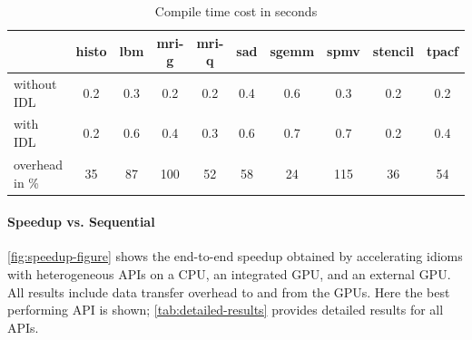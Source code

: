 \begin{table}[t]
  \begin{tabular}{lccccccccc}
  \toprule
  & \hspace{0.530mm}histo\hspace{0.53mm}
  & \hspace{0.530mm}lbm\hspace{0.530mm}
  & \hspace{0.530mm}mri-g\hspace{0.530mm}
  & \hspace{0.530mm}mri-q\hspace{0.530mm}
  & \hspace{0.530mm}sad\hspace{0.530mm}
  & \hspace{0.530mm}sgemm\hspace{0.530mm}
  & \hspace{0.530mm}spmv\hspace{0.530mm}
  & \hspace{0.530mm}stencil\hspace{0.530mm}
  & \hspace{0.530mm}tpacf\hspace{0.530mm} \\
  \midrule
without IDL    & 0.2 & 0.3 & 0.2 & 0.2 & 0.4 & 0.6 & 0.3 & 0.2 & 0.2 \\[0.25em]
with IDL       & 0.2 & 0.6 & 0.4 & 0.3 & 0.6 & 0.7 & 0.7 & 0.2 & 0.4 \\[0.75em]
overhead in \% &  35 &  87 & 100 &  52 &  58 &  24 & 115 &  36 &  54 \\
  \bottomrule
\end{tabular}

  \vspace{.1cm}
\caption{Compile time cost in seconds}
\label{tab:compiletimecost}
\end{table}
\addtolength{\tabcolsep}{+.3em}

\paragraph*{Speedup vs. Sequential}
\autoref{fig:speedup-figure} shows the end-to-end speedup obtained by accelerating idioms with heterogeneous APIs on a CPU, an integrated GPU, and an external GPU.
All results include data transfer overhead to and from the GPUs.
Here the best performing API is shown;
\autoref{tab:detailed-results} provides detailed results  for all APIs. 

